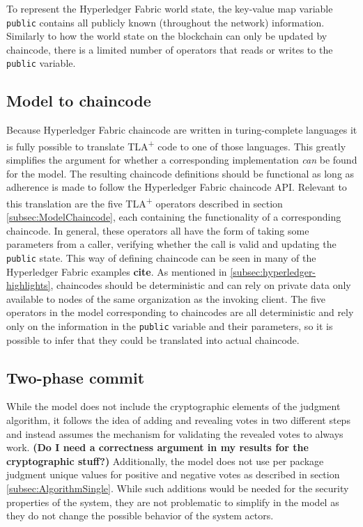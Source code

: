 To represent the Hyperledger Fabric world state, the key-value map variable \texttt{public} contains all publicly known (throughout the network) information. Similarly to how the world state on the blockchain can only be updated by chaincode, there is a limited number of operators that reads or writes to the \texttt{public} variable.

\subsection{Model to chaincode}
\label{subsec:DiscussionModelToChaincode}

Because Hyperledger Fabric chaincode are written in turing-complete languages it is fully possible to translate TLA\textsuperscript+ code to one of those languages. This greatly simplifies the argument for whether a corresponding implementation \textit{can} be found for the model. The resulting chaincode definitions should be functional as long as adherence is made to follow the Hyperledger Fabric chaincode API. Relevant to this translation are the five TLA\textsuperscript+ operators described in section \ref{subsec:ModelChaincode}, each containing the functionality of a corresponding chaincode. In general, these operators all have the form of taking some parameters from a caller, verifying whether the call is valid and updating the \texttt{public} state. This way of defining chaincode can be seen in many of the Hyperledger Fabric examples \textbf{cite}. As mentioned in \ref{subsec:hyperledger-highlights}, chaincodes should be deterministic and can rely on private data only available to nodes of the same organization as the invoking client. The five operators in the model corresponding to chaincodes are all deterministic and rely only on the information in the \texttt{public} variable and their parameters, so it is possible to infer that they could be translated into actual chaincode.

\subsection{Two-phase commit}
\label{subsec:DiscussionTwoPhaseCommit}

While the model does not include the cryptographic elements of the judgment algorithm, it follows the idea of adding and revealing votes in two different steps and instead assumes the mechanism for validating the revealed votes to always work. \textbf{(Do I need a correctness argument in my results for the cryptographic stuff?)} Additionally, the model does not use per package judgment unique values for positive and negative votes as described in section \ref{subsec:AlgorithmSingle}. While such additions would be needed for the security properties of the system, they are not problematic to simplify in the model as they do not change the possible behavior of the system actors.

